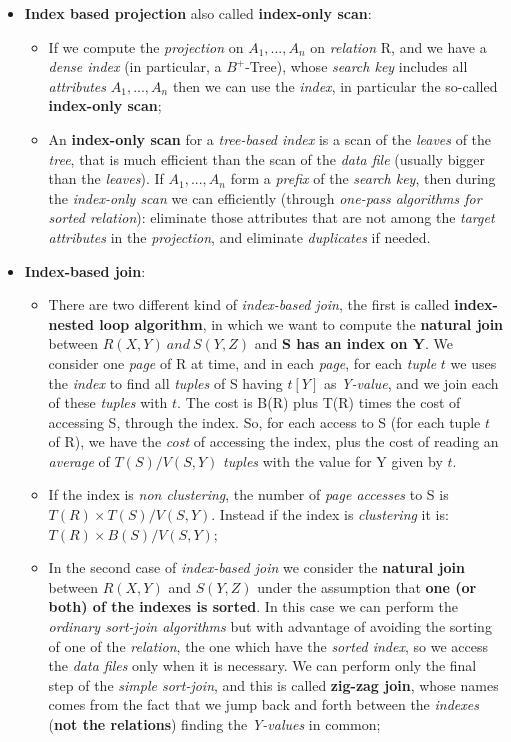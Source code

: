 \documentclass{article}
\begin{document}
\begin{itemize}
\item \textbf{Index based projection} also called \textbf{index-only scan}:
\begin{itemize}
\item If we compute the \emph{projection} on $A_1, ... , A_n$ on \emph{relation} R, and we have a \emph{dense index} (in particular, a $B^+$-Tree), whose \emph{search key} includes all \emph{attributes} $A_1, ... , A_n$ then we can use the \emph{index}, in particular the so-called \textbf{index-only scan};
\item An \textbf{index-only scan} for a \emph{tree-based index} is a scan of the \emph{leaves} of the \emph{tree}, that is much efficient than the scan of the \emph{data file} (usually bigger than the \emph{leaves}). If $A_1, ... , A_n$ form a \emph{prefix} of the \emph{search key}, then during the \emph{index-only scan} we can efficiently (through \emph{one-pass algorithms for sorted relation}): eliminate those attributes that are not among the \emph{target attributes} in the \emph{projection}, and eliminate \emph{duplicates} if needed. 
\end{itemize}
\item \textbf{Index-based join}:
\begin{itemize}
\item There are two different kind of \emph{index-based join}, the first is called \textbf{index-nested loop algorithm}, in which we want to compute the \textbf{natural join} between $R(X,Y)\ and\ S(Y,Z)$ and\textbf{ S has an index on Y}. We consider one \emph{page} of R at time, and in each \emph{page}, for each \emph{tuple} $t$ we uses the \emph{index} to find all \emph{tuples} of S having $t[Y]$ as \emph{Y-value}, and we join each of these \emph{tuples} with $t$. The cost is B(R) plus T(R) times the cost of accessing S, through the index. So, for each access to S (for each tuple $t$ of R), we have the \emph{cost} of accessing the index, plus the cost of reading an \emph{average} of $T(S)/V(S,Y)$ \emph{tuples} with the value for Y given by $t$. 
\item If the index is \emph{non clustering}, the number of \emph{page accesses} to S is $T(R) \times T(S)/V(S,Y)$. Instead if the index is \emph{clustering} it is: $T(R) \times B(S)/V(S,Y)$;
\item In the second case of \emph{index-based join} we consider the \textbf{natural join} between $R(X,Y)$ and $S(Y,Z)$ under the assumption that \textbf{one (or both) of the indexes is sorted}. In this case we can perform the \emph{ordinary sort-join algorithms} but with advantage of avoiding the sorting of one of the \emph{relation}, the one which have the \emph{sorted index}, so we access the \emph{data files} only when it is necessary. We can perform only the final step of the \emph{simple sort-join}, and this is called \textbf{zig-zag join}, whose names comes from the fact that we jump back and forth between the \emph{indexes} (\textbf{not the relations}) finding the\emph{ Y-values} in common;

\end{itemize}
\end{itemize}
\end{document}
